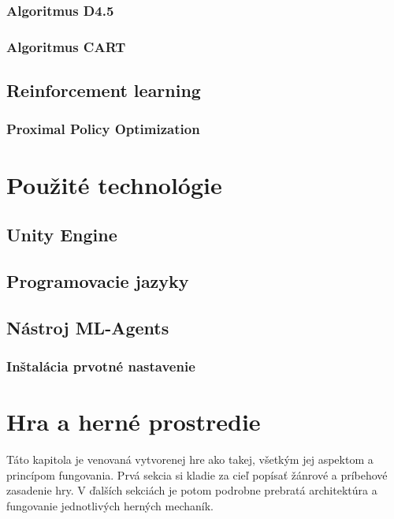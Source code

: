 \documentclass[slovak, master]{diploma}
\begin{document}
\subsection{Algoritmus D4.5}
\label{sec:D45}
\subsection{Algoritmus CART}
\label{sec:CART}

\section{Reinforcement learning}
\label{sec:ReinforcemenLearningOverview}

\subsection{Proximal Policy Optimization}
\label{sec:PPO}


\chapter{Použité technológie}
\label{sec:Tech}
\section{Unity Engine}
\label{sec:Unity}
\section{Programovacie jazyky}
\label{sec:langs}
\section{Nástroj ML-Agents}
\label{sec:ML-Agents}
\subsection{Inštalácia prvotné nastavenie}
\label{sec:MLAgentsInstall}

\chapter{Hra a herné prostredie}
\label{sec:GameOverview}
Táto kapitola je venovaná vytvorenej hre ako takej, všetkým jej aspektom a princípom fungovania. Prvá sekcia si kladie za cieľ popísať žánrové a príbehové zasadenie hry. V ďalších sekciách je potom podrobne prebratá architektúra a fungovanie jednotlivých herných mechaník.
\end{document}
